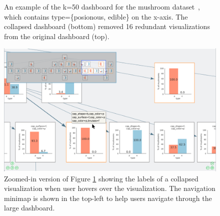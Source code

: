 {\begin{figure}[ht!]
  \caption{An example of the k=50 dashboard for the mushroom dataset~\cite{mushroom}, which contains type=\{posionous, edible\} on the x-axis. The collapsed dashboard (bottom) removed 16 redundant visualizations from the original dashboard (top).}
  \label{fig:collapse_demo}
  \end{figure}
  \begin{figure}[ht!]
  \centering
  \includegraphics[width=\linewidth]{figures/minimap_zoom.png}
  \caption{Zoomed-in version of Figure \ref{fig:collapse_demo} showing the labels of a collapsed visualization when user hovers over the visualization. The navigation minimap is shown in the top-left to help users navigate through the large dashboard.}
  \label{fig:hover_minimap}
  \end{figure}
}
